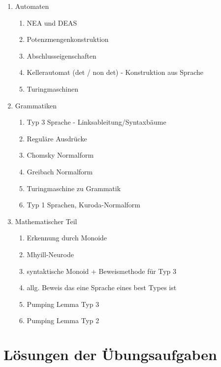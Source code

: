 \documentclass[12pt]{scrartcl}
\begin{document}
\begin{enumerate}
	\item Automaten
		\begin{enumerate}
			\item NEA und DEAS
			\item Potenzmengenkonstruktion
			\item Abschlusseigenschaften
			\item Kellerautomat (det / non det) - Konstruktion aus Sprache 
			\item Turingmaschinen 
		\end{enumerate}
		
	\item Grammatiken
		\begin{enumerate}
			\item Typ 3 Sprache - Linksableitung/Syntaxbäume
			\item Reguläre Ausdrücke
			\item Chomsky Normalform
			\item Greibach Normalform
			\item Turingmaschine zu Grammatik
			\item Typ 1 Sprachen, Kuroda-Normalform
		\end{enumerate}
		
		\item Mathematischer Teil
		\begin{enumerate}
			\item Erkennung durch Monoide 
			\item Mhyill-Neurode
			\item syntaktische Monoid + Beweismethode für Typ 3
			\item allg. Beweis das eine Sprache eines best Types ist 
			\item Pumping Lemma Typ 3
			\item Pumping Lemma Typ 2
		\end{enumerate}
\end{enumerate}

\newpage

\section{Lösungen der Übungsaufgaben}
	
\end{document}
